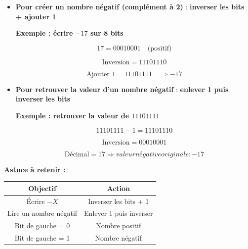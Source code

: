 \documentclass[a4paper,12pt]{article}
\begin{document}
\begin{itemize} 

    \item \textbf{Pour créer un nombre négatif (complément à 2)} : \textbf{inverser les bits + ajouter 1}   

    \textbf{Exemple : écrire $-17$ sur 8 bits}  

\[ 

17 = 00010001 \quad\text{(positif)} 

\] 

\[ 

\text{Inversion} = 11101110 

\] 

\[ 

\text{Ajouter 1} = 11101111 \quad \Rightarrow -17 

\] 

  

    \item \textbf{Pour retrouver la valeur d’un nombre négatif} : \textbf{enlever 1 puis inverser les bits}   

    \textbf{Exemple : retrouver la valeur de $11101111$}  

\[ 

11101111 - 1 = 11101110 

\] 

\[ 

\text{Inversion} = 00010001 

\] 

\[ 

\text{Décimal} = 17 \Rightarrow valeur négative originale : -17 

\] 

\end{itemize} 

  

\textbf{Astuce à retenir :} 

\begin{center} 

\begin{tabular}{|c|c|} 

\hline 

\textbf{Objectif} & \textbf{Action} \\ \hline 

Écrire $-X$ & Inverser les bits + 1 \\ \hline 

Lire un nombre négatif & Enlever 1 puis inverser \\ \hline 

Bit de gauche = 0 & Nombre positif \\ \hline 

Bit de gauche = 1 & Nombre négatif \\ \hline 

\end{tabular} 

\end{center} 
\end{document}
